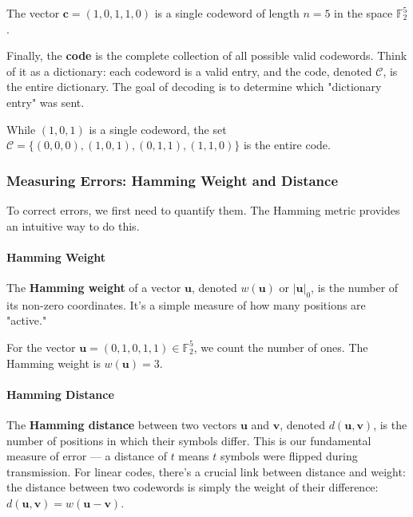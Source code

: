 \documentclass{article}
\begin{document}
\begin{tcolorbox}[title=Example: A Binary Codeword]
The vector $\mathbf{c} = (1, 0, 1, 1, 0)$ is a single codeword of length $n=5$ in the space $\mathbb{F}_2^5$.
\end{tcolorbox}

Finally, the \textbf{code} is the complete collection of all possible valid codewords. Think of it as a dictionary: each codeword is a valid entry, and the code, denoted $\mathcal{C}$, is the entire dictionary. The goal of decoding is to determine which "dictionary entry" was sent.

\begin{tcolorbox}[title=Example: A Simple Code]
While $(1,0,1)$ is a single codeword, the set $\mathcal{C} = \{ (0,0,0), (1,0,1), (0,1,1), (1,1,0) \}$ is the entire code.
\end{tcolorbox}

\subsubsection{Measuring Errors: Hamming Weight and Distance}
To correct errors, we first need to quantify them. The Hamming metric provides an intuitive way to do this.

\paragraph{Hamming Weight}
The \textbf{Hamming weight} of a vector $\mathbf{u}$, denoted $w(\mathbf{u})$ or $|\mathbf{u}|_0$, is the number of its non-zero coordinates. It's a simple measure of how many positions are "active."

\begin{tcolorbox}[title=Example: Hamming Weight]
For the vector $\mathbf{u} = (0, 1, 0, 1, 1) \in \mathbb{F}_2^5$, we count the number of ones. The Hamming weight is $w(\mathbf{u}) = 3$.
\end{tcolorbox}

\paragraph{Hamming Distance}
The \textbf{Hamming distance} between two vectors $\mathbf{u}$ and $\mathbf{v}$, denoted $d(\mathbf{u}, \mathbf{v})$, is the number of positions in which their symbols differ. This is our fundamental measure of error — a distance of $t$ means $t$ symbols were flipped during transmission. For linear codes, there's a crucial link between distance and weight: the distance between two codewords is simply the weight of their difference: $d(\mathbf{u}, \mathbf{v}) = w(\mathbf{u} - \mathbf{v})$.
\end{document}
